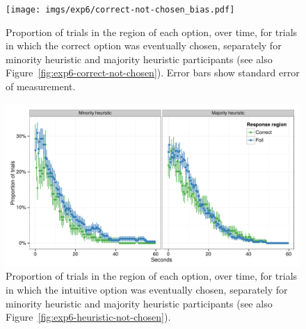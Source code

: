 \begin{figure}[h]
  \centering
  \texttt{[image: imgs/exp6/correct-not-chosen\_bias.pdf]}
  \caption[]{   
    Proportion of trials in the region of each option, over time,
    for trials in which the correct option was eventually chosen,
    separately for minority heuristic and majority heuristic participants
    (see also Figure~\ref{fig:exp6-correct-not-chosen}).
    Error bars show standard error of measurement.
  }
\end{figure}

\begin{figure}[h]
  \centering
  \includegraphics[width=.9\textwidth]{imgs/exp6/heuristic-not-chosen_bias}
  \caption[]{
    Proportion of trials in the region of each option, over time,
    for trials in which the intuitive option was eventually chosen,
    separately for minority heuristic and majority heuristic participants
    (see also Figure~\ref{fig:exp6-heuristic-not-chosen}).
  }
\end{figure}
